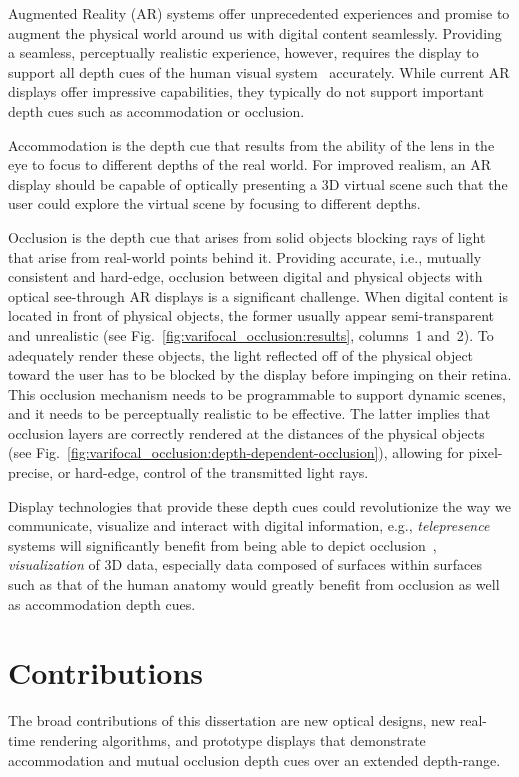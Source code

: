 Augmented Reality (AR) systems offer unprecedented experiences and promise to augment the physical world around us with digital content seamlessly. Providing a seamless, perceptually realistic experience, however, requires the display to support all depth cues of the human visual system~\cite{Palmer:1999,Howard:2002} accurately. While current AR displays offer impressive capabilities, they typically do not support important depth cues such as accommodation or occlusion.

Accommodation is the depth cue that results from the ability of the lens in the eye to focus to different depths of the real world. For improved realism, an AR display should be capable of optically presenting a 3D virtual scene such that the user could explore the virtual scene by focusing to different depths.

Occlusion is the depth cue that arises from solid objects blocking rays of light that arise from real-world points behind it. Providing accurate, i.e., mutually consistent and hard-edge, occlusion between digital and physical objects with optical see-through AR displays is a significant challenge. When digital content is located in front of physical objects, the former usually appear semi-transparent and unrealistic (see Fig.~\ref{fig:varifocal_occlusion:results}, columns~1 and~2). To adequately render these objects, the light reflected off of the physical object toward the user has to be blocked by the display before impinging on their retina. This occlusion mechanism needs to be programmable to support dynamic scenes, and it needs to be perceptually realistic to be effective. The latter implies that occlusion layers are correctly rendered at the distances of the physical objects (see Fig.~\ref{fig:varifocal_occlusion:depth-dependent-occlusion}), allowing for pixel-precise, or hard-edge, control of the transmitted light rays.

Display technologies that provide these depth cues could revolutionize the way we communicate, visualize and interact with digital information, e.g., \emph{telepresence} systems will significantly benefit from being able to depict occlusion~\cite{maimone2013general}, \emph{visualization} of 3D data, especially data composed of surfaces within surfaces such as that of the human anatomy would greatly benefit from occlusion as well as accommodation depth cues.

\section{Contributions}
The broad contributions of this dissertation are new optical designs, new real-time rendering algorithms, and prototype displays that demonstrate accommodation and mutual occlusion depth cues over an extended depth-range.

